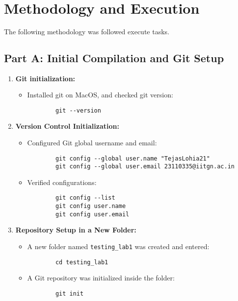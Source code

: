 \documentclass[12pt, a4paper]{report}
\begin{document}
\
\section{Methodology and Execution}

The following methodology was followed execute tasks.
\subsection*{Part A: Initial Compilation and Git Setup}

\begin{enumerate}
    \item \textbf{Git initialization:}
    \begin{itemize}
        \item Installed git on MacOS, and checked git version:
        \begin{verbatim}
        git --version
        \end{verbatim}
    \end{itemize}

    \item \textbf{Version Control Initialization:}
    \begin{itemize}
        \item Configured Git global username and email:
        \begin{verbatim}
        git config --global user.name "TejasLohia21"
        git config --global user.email 23110335@iitgn.ac.in
        \end{verbatim}

        \item Verified configurations:
        \begin{verbatim}
        git config --list
        git config user.name
        git config user.email
        \end{verbatim}
    \end{itemize}

    \item \textbf{Repository Setup in a New Folder:}
    \begin{itemize}
        \item A new folder named \texttt{testing\_lab1} was created and entered:
        \begin{verbatim}
        cd testing_lab1
        \end{verbatim}

        \item A Git repository was initialized inside the folder:
        \begin{verbatim}
        git init
        \end{verbatim}


\end{itemize}
\end{enumerate}
\end{document}
